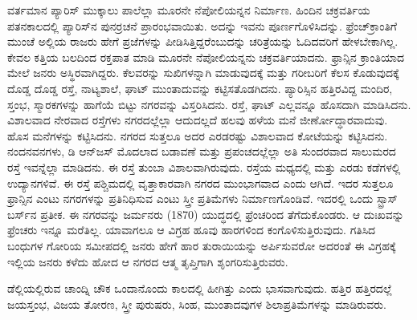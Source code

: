 ವರ್ತಮಾನ ಪ್ಯಾರಿಸ್​ ಮುಕ್ಕಾಲು ಪಾಲೆಲ್ಲಾ ಮೂರನೇ ನೆಪೋಲಿಯನ್ನನ ನಿರ್ಮಾಣ. ಹಿಂದಿನ ಚಕ್ರವರ್ತಿಯ ಪತನಕಾಲದಲ್ಲಿ ಪ್ಯಾರಿಸ್​ನ ಪುನರ್ರಚನೆ ಪ್ರಾರಂಭವಾಯಿತು. ಅದನ್ನು ಇವನು ಪೂರ್ಣಗೊಳಿಸಿದನ್ನು. ಫ್ರೆಂಚ್​ ಕ್ರಾಂತಿಗೆ ಮುಂಚೆ ಅಲ್ಲಿಯ ರಾಜರು ಹೇಗೆ ಪ್ರಜೆಗಳನ್ನು ಪೀಡಿಸಿತ್ತಿದ್ದರೆಂಬುದನ್ನು ಚರಿತ್ರೆಯನ್ನು ಓದಿದವರಿಗೆ ಹೇಳಬೇಕಾಗಿಲ್ಲ. ಕೇವಲ ಕತ್ತಿಯ ಬಲದಿಂದ ರಕ್ತಪಾತ ಮಾಡಿ ಮೂರನೇ ನೆಪೋಲಿಯನ್ನನು ಚಕ್ರವರ್ತಿಯಾದನು. ಫ್ರಾನ್ಸಿನ ಕ್ರಾಂತಿಯಾದ ಮೇಲೆ ಜನರು ಅಸ್ಥಿರವಾಗಿದ್ದರು. ಕೆಲವರನ್ನು ಸುಖಿಗಳನ್ನಾಗಿ ಮಾಡುವುದಕ್ಕೆ ಮತ್ತು ಗರೀಬರಿಗೆ ಕೆಲಸ ಕೊಡುವುದಕ್ಕೆ ದೊಡ್ಡ ದೊಡ್ಡ ರಸ್ತೆ, ನಾಟ್ಯಶಾಲೆ, ಘಾಟ್​ ಮುಂತಾದುವನ್ನು ಕಟ್ಟಿಸತೊಡಗಿದನು. ಪ್ಯಾರಿಸ್ಸಿನ ಹತ್ತಿರವಿದ್ದ ಮಂದಿರ, ಸ್ತಂಭ, ಸ್ಮಾರಕಗಳನ್ನು ಹಾಗೆಯೆ ಬಿಟ್ಟು ನಗರವನ್ನು ವಿಸ್ತರಿಸಿದನು. ರಸ್ತೆ, ಘಾಟ್​ ಎಲ್ಲವನ್ನೂ ಹೊಸದಾಗಿ ಮಾಡಿಸಿದನು. ವಿಶಾಲವಾದ ನೇರವಾದ ರಸ್ತೆಗಳು ನಗರದಲ್ಲೆಲ್ಲಾ ಆದುದಲ್ಲದೆ ಹಲವು ಹಳೆಯ ಮನೆ ಜೀರ್ಣೋದ್ಧಾರವಾದುವು. ಹೊಸ ಮನೆಗಳನ್ನು ಕಟ್ಟಿಸಿದನು. ನಗರದ ಸುತ್ತಲೂ ಅದರ ಎರಡರಷ್ಟು ವಿಶಾಲವಾದ ಕೋಟೆಯನ್ನು ಕಟ್ಟಿಸಿದನು. ನಂದನವನಗಳು, ಡಿ ಆನ್​ಜಸ್​ ಮೊದಲಾದ ಬಡಾವಣೆ ಮತ್ತು ಪ್ರಪಂಚದಲ್ಲೆಲ್ಲಾ ಅತಿ ಸುಂದರವಾದ ಸಾಲುಮರದ ರಸ್ತೆ  ಇವನ್ನೆಲ್ಲಾ ಮಾಡಿದನು. ಈ ರಸ್ತೆ ತುಂಬಾ ವಿಶಾಲವಾಗಿರುವುದು. ರಸ್ತೆಯ ಮಧ್ಯದಲ್ಲಿ ಮತ್ತು ಎರಡು ಕಡೆಗಳಲ್ಲಿ ಉದ್ಯಾನಗಳಿವೆ. ಈ ರಸ್ತೆ ಪಶ್ಚಿಮದಲ್ಲಿ ವೃತ್ತಾಕಾರವಾಗಿ ನಗರದ ಮುಂಭಾಗವಾದ  ಎಂದು ಆಗಿದೆ. ಇದರ ಸುತ್ತಲೂ ಫ್ರಾನ್ಸಿನ ಎಂಟು ನಗರಗಳನ್ನು ಪ್ರತಿನಿಧಿಸುವ ಎಂಟು ಸ್ತ್ರೀ ಪ್ರತಿಮೆಗಳು ನಿರ್ಮಾಣಗೊಂಡಿವೆ. ಇದರಲ್ಲಿ ಒಂದು ಸ್ಟ್ರಾಸ್​ ಬರ್ಸ್​ನ ಪ್ರತೀಕ. ಈ ನಗರವನ್ನು ಜರ್ಮನರು (1870) ಯುದ್ಧದಲ್ಲಿ ಫ್ರೆಂಚರಿಂದ ತೆಗೆದುಕೊಂಡರು. ಆ ದುಃಖವನ್ನು ಫ್ರೆಂಚರು ಇನ್ನೂ ಮರೆತಿಲ್ಲ. ಯಾವಾಗಲೂ ಆ ವಿಗ್ರಹ ಹೂವು ಹಾರಗಳಿಂದ ಕಂಗೊಳಿಸುತ್ತಿರುವುದು. ಗತಿಸಿದ ಬಂಧುಗಳ ಗೋರಿಯ ಸಮೀಪದಲ್ಲಿ ಜನರು ಹೇಗೆ ಹಾರ ತುರಾಯಿಯನ್ನು ಅರ್ಪಿಸುವರೋ ಅದರಂತೆ ಈ ವಿಗ್ರಹಕ್ಕೆ ಇಲ್ಲಿಯ ಜನರು ಕಳೆದು ಹೋದ ಆ ನಗರದ ಆತ್ಮ ತೃಪ್ತಿಗಾಗಿ ಶೃಂಗರಿಸುತ್ತಿರುವರು.

\vskip 5pt

ಡೆಲ್ಲಿಯಲ್ಲಿರುವ ಚಾಂದ್ನಿ ಚೌಕ ಒಂದಾನೊಂದು ಕಾಲದಲ್ಲಿ ಹೀಗಿತ್ತು ಎಂದು ಭಾಸ\break ವಾಗುವುದು. ಹತ್ತಿರ ಹತ್ತಿರದಲ್ಲೆ ಜಯಸ್ತಂಭ, ವಿಜಯ ತೋರಣ, ಸ್ತ್ರೀ ಪುರುಷರು, ಸಿಂಹ, ಮುಂತಾದವುಗಳ ಶಿಲಾಪ್ರತಿಮೆಗಳನ್ನು ಮಾಡಿರುವರು.

\vskip 5pt

